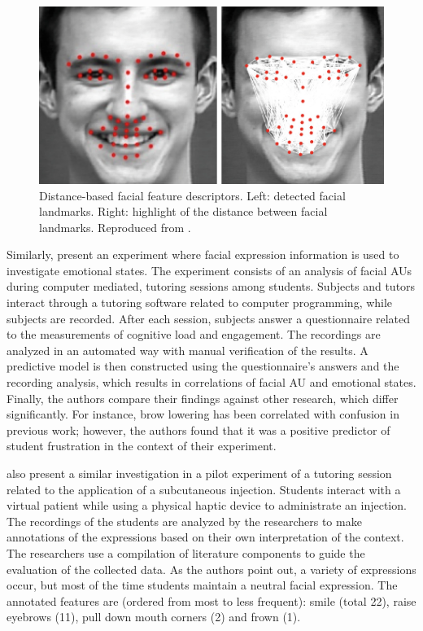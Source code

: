 \begin{figure}[h]
    \centering
    \includegraphics[width=0.75\linewidth]{Content/figures/samara2016sensing-distances.png}
    \caption{Distance-based facial feature descriptors. Left: detected facial landmarks. Right: highlight of the distance between facial landmarks. Reproduced from \textcite{samara2016sensing}.}
    \label{fig:distance-samara}
\end{figure}

Similarly, \textcite{grafsgaard2013automatically} present an experiment where facial expression information is used to investigate emotional states. The experiment consists of an analysis of facial AUs during computer mediated, tutoring sessions among students. Subjects and tutors interact through a tutoring software related to computer programming, while subjects are recorded. After each session, subjects answer a questionnaire related to the measurements of cognitive load and engagement. The recordings are analyzed in an automated way with manual verification of the results. A predictive model is then constructed using the questionnaire's answers and the recording analysis, which results in correlations of facial AU and emotional states. Finally, the authors compare their findings against other research, which differ significantly. For instance, brow lowering has been correlated with confusion in previous work; however, the authors found that it was a positive predictor of student frustration in the context of their experiment.

\textcite{heylen2005facial} also present a similar investigation in a pilot experiment of a tutoring session related to the application of a subcutaneous injection. Students interact with a virtual patient while using a physical haptic device to administrate an injection. The recordings of the students are analyzed by the researchers to make annotations of the expressions based on their own interpretation of the context. The researchers use a compilation of literature components to guide the evaluation of the collected data. As the authors point out, a variety of expressions occur, but most of the time students maintain a neutral facial expression. The annotated features are (ordered from most to less frequent): smile (total 22), raise eyebrows (11), pull down mouth corners (2) and frown (1).

